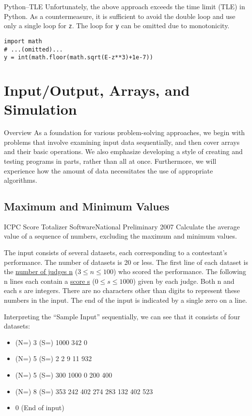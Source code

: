 \begin{debugbox}{Python--TLE}
Unfortunately, the above approach exceeds the time limit (TLE) in Python. As a countermeasure, it is sufficient to avoid the double loop and use only a single loop for \texttt{z}.
The loop for \texttt{y} can be omitted due to monotonicity.
\begin{pybox}
\begin{verbatim}
import math
# ...(omitted)...
y = int(math.floor(math.sqrt(E-z**3)+1e-7))
\end{verbatim}
\end{pybox}
\end{debugbox}
\chapter{Input/Output, Arrays, and Simulation}\label{chapter:io}
\begin{itembox}[l]{Overview}
As a foundation for various problem-solving approaches, we begin with problems that involve examining input data sequentially, and then cover arrays and their basic operations.
We also emphasize developing a style of creating and testing programs in parts, rather than all at once.
Furthermore, we will experience how the amount of data necessitates the use of appropriate algorithms.
\end{itembox}
\section{Maximum and Minimum Values}

\begin{psbox}{ICPC Score Totalizer Software}{National Preliminary 2007}
Calculate the average value of a sequence of numbers, excluding the maximum and minimum values.

The input consists of several datasets, each corresponding to a contestant's performance. The number of datasets is 20 or less.
The first line of each dataset is the \uline{number of judges n} ($3 \le n \le 100$) who scored the performance. The following n lines each contain a \uline{score s} ($0 \le s \le 1000$) given by each judge. Both n and each s are integers. There are no characters other than digits to represent these numbers in the input.
The end of the input is indicated by a single zero on a line.
  
\end{psbox}


Interpreting the ``Sample Input'' sequentially, we can see that it consists of four datasets:
\begin{itemize}
\item (N=) 3 (S=) 1000 342 0
\item (N=) 5 (S=) 2 2 9 11 932 
\item (N=) 5 (S=) 300 1000 0 200 400
\item (N=) 8 (S=) 353 242 402 274 283 132 402 523
\item 0 (End of input)
\end{itemize}

